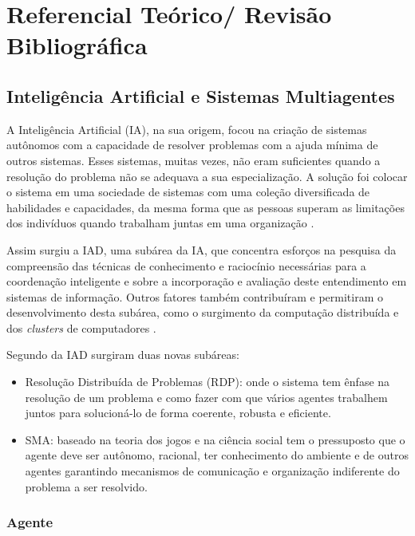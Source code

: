 \chapter{Referencial Teórico/ Revisão Bibliográfica}

\section{Inteligência Artificial e Sistemas Multiagentes}

A Inteligência Artificial (IA), na sua origem, focou na criação de sistemas autônomos com a capacidade de resolver problemas com a ajuda mínima de outros sistemas. Esses sistemas, muitas vezes, não eram suficientes quando a resolução do problema não se adequava a sua especialização. A solução foi colocar o sistema em uma sociedade de sistemas com uma coleção diversificada de habilidades e capacidades, da mesma forma que as pessoas superam as limitações dos indivíduos quando trabalham juntas em uma organização \cite{durfee1991distributed}. 

Assim surgiu a IAD, uma subárea da IA, que concentra esforços na pesquisa da compreensão das técnicas de conhecimento e raciocínio necessárias para a coordenação inteligente e sobre a incorporação e avaliação deste entendimento em sistemas de informação. Outros fatores também contribuíram e permitiram o desenvolvimento desta subárea, como o surgimento da computação distribuída e dos \textit{clusters} de computadores \cite{durfee1991distributed,bond2014readings}.

Segundo \cite{durfee1994distributed} da IAD surgiram duas novas subáreas:

\begin{itemize}
\item Resolução Distribuída de Problemas (RDP): onde o sistema tem ênfase na resolução de um problema e como fazer com que vários agentes trabalhem juntos para solucioná-lo de forma coerente, robusta e eficiente.

\item SMA: baseado na teoria dos jogos e na ciência social tem o pressuposto que o agente deve ser autônomo, racional, ter conhecimento do ambiente e de outros agentes garantindo mecanismos de comunicação e organização indiferente do problema a ser resolvido.
\end{itemize}

\subsection{Agente}

